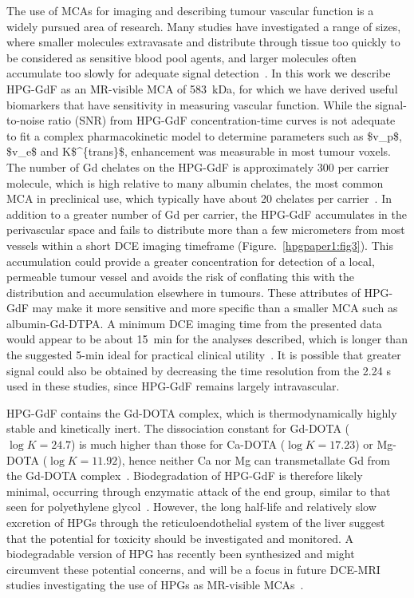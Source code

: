 The use of \acs{MCA}s for imaging and describing tumour vascular function is a widely pursued area of research.
Many studies have investigated a range of sizes, where smaller molecules extravasate and distribute through tissue too quickly to be considered as sensitive blood pool agents, and larger molecules often accumulate too slowly for adequate signal detection~\cite{Kyle:2007ch,Tang:2013fi,Sourbron:2011ce}.
In this work we describe \acs{HPG-GdF} as an MR-visible \acs{MCA} of 583~\acs{kDa}, for which we have derived useful biomarkers that have sensitivity in measuring vascular function.
While the signal-to-noise ratio (\acs{SNR}) from \acs{HPG-GdF} concentration-time curves is not adequate to fit a complex pharmacokinetic model to determine parameters such as \acs{$v_p$}, \acs{$v_e$} and \acs{K$^{trans}$}, enhancement was measurable in most tumour voxels.
The number of Gd chelates on the \acs{HPG-GdF} is approximately 300 per carrier molecule, which is high relative to many albumin chelates, the most common \acs{MCA} in preclinical use, which typically have about 20 chelates per carrier~\cite{Ogan:1987tg}.
In addition to a greater number of Gd per carrier, the \acs{HPG-GdF} accumulates in the perivascular space and fails to distribute more than a few micrometers from most vessels within a short DCE imaging timeframe (Figure.~\ref{hpgpaper1:fig3}).
This accumulation could provide a greater concentration for detection of a local, permeable tumour vessel and avoids the risk of conflating this with the distribution and accumulation elsewhere in tumours.
These attributes of \acs{HPG-GdF} may make it more sensitive and more specific than a smaller  \acs{MCA} such as albumin-Gd-DTPA.
A minimum DCE imaging time from the presented data would appear to be about 15~min for the analyses described, which is longer than the suggested 5-min ideal for practical clinical utility~\cite{Turetschek:2004bw}.
It is possible that greater signal could also be obtained by decreasing the time resolution from the 2.24 s used in these studies, since \acs{HPG-GdF} remains largely intravascular.

\acs{HPG-GdF} contains the Gd-\acs{DOTA} complex, which is thermodynamically highly  stable and kinetically inert.
The dissociation constant for Gd-\acs{DOTA} ($\log K = 24.7$) is much higher than those for Ca-\acs{DOTA} ($\log K = 17.23$) or Mg-\acs{DOTA} ($\log K = 11.92$), hence neither Ca nor Mg can transmetallate Gd from the Gd-\acs{DOTA} complex~\cite{Baranyai:2005ta}.
Biodegradation of \acs{HPG-GdF} is therefore likely minimal, occurring through enzymatic attack of the end group, similar to that seen for polyethylene glycol~\cite{Kawai:2002fc}.
However, the long half-life and relatively slow excretion of HPGs through the reticuloendothelial system of the liver suggest that the potential for toxicity should be investigated and monitored.
A biodegradable version of HPG has recently been synthesized and might circumvent these potential concerns, and will be a focus in future \acs{DCE-MRI} studies investigating the use of HPGs as MR-visible \acs{MCA}s~\cite{Shenoi:2013id}.

